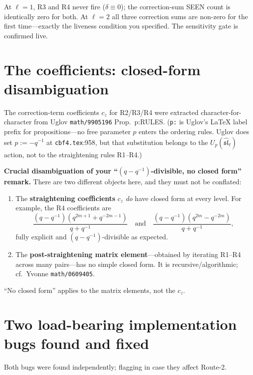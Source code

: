 \documentclass[11pt,a4paper]{article}
\begin{document}
At $\ell=1$, R3 and R4 never fire ($\delta\equiv 0$); the correction-sum SEEN count is
identically zero for both.  At $\ell=2$ all three correction sums are non-zero for the
first time---exactly the liveness condition you specified.  The sensitivity gate is
confirmed live.

\section{The coefficients: closed-form disambiguation}

The correction-term coefficients $c_z$ for R2/R3/R4 were extracted
character-for-character from Uglov \texttt{math/9905196} Prop.\ p:RULES.
(\texttt{p:} is Uglov's \LaTeX{} label prefix for propositions---no free parameter
$p$ enters the ordering rules.  Uglov does set $p := -q^{-1}$ at
\texttt{cbf4.tex}:958, but that substitution belongs to the $U_p(\hat{\mathfrak{sl}}_\ell)$
action, not to the straightening rules R1--R4.)

\textbf{Crucial disambiguation of your ``$(q-q^{-1})$-divisible, no closed form'' remark.}
There are two different objects here, and they must not be conflated:

\begin{enumerate}[nosep]
  \item The \textbf{straightening coefficients} $c_z$ \emph{do} have closed form at every
    level.  For example, the R4 coefficients are
    \[
      \frac{(q-q^{-1})(q^{2m+1}+q^{-2m-1})}{q+q^{-1}}
      \quad\text{and}\quad
      \frac{(q-q^{-1})(q^{2m}-q^{-2m})}{q+q^{-1}},
    \]
    fully explicit and $(q-q^{-1})$-divisible as expected.

  \item The \textbf{post-straightening matrix element}---obtained by iterating R1--R4
    across many pairs---has no simple closed form.  It is recursive/algorithmic;
    cf.\ Yvonne \texttt{math/0609405}.
\end{enumerate}

``No closed form'' applies to the matrix elements, not the $c_z$.

\section{Two load-bearing implementation bugs found and fixed}

Both bugs were found independently; flagging in case they affect Route-2.
\end{document}
